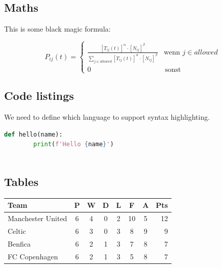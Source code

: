 \subsection{Maths}

This is some black magic formula:

\begin{equation}
    \label{eq_ant}
    P_{ij}(t) = \begin{cases}
        \frac{[T_{ij}(t)]^\alpha \cdot [N_{ij}]^\beta}
        {\sum_{j \in {allowed}}^{} [T_{ij}(t)]^\alpha \cdot [N_{ij}]^\beta} & \text{wenn } j \in {allowed} \\
        0 & \, \text{sonst}
        \end{cases}
\end{equation}
\label{eq_ant1}

\subsection{Code listings}

We need to define which language to support syntax highlighting.

\begin{lstlisting}[language=Python, caption=Hello World (Python)]
    def hello(name):
        print(f'Hello {name}')
            
\end{lstlisting}

\subsection{Tables}

\begin{tabular}{l*{6}{c}r}
    Team              & P & W & D & L & F  & A & Pts \\
    \hline
    Manchester United & 6 & 4 & 0 & 2 & 10 & 5 & 12  \\
    Celtic            & 6 & 3 & 0 & 3 &  8 & 9 &  9  \\
    Benfica           & 6 & 2 & 1 & 3 &  7 & 8 &  7  \\
    FC Copenhagen     & 6 & 2 & 1 & 3 &  5 & 8 &  7  \\
\end{tabular}
\label{tbl:football}